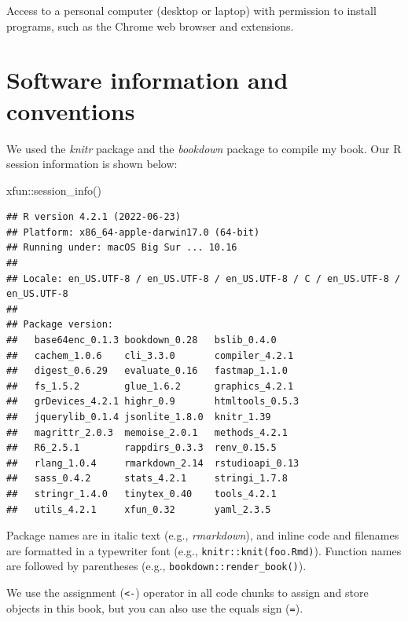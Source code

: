\documentclass[
  krantz2]{krantz}
\makeatletter
\newenvironment{Shaded}{\begin{snugshade}}{\end{snugshade}}
\newcommand{\FunctionTok}[1]{\textcolor[rgb]{0,0,0}{#1}}
\newcommand{\NormalTok}[1]{#1}
\newcommand{\SpecialCharTok}[1]{\textcolor[rgb]{0,0,0}{#1}}
\newenvironment{kframe}{%
\medskip{}
\setlength{\fboxsep}{.8em}
 \def\at@end@of@kframe{}%
 \ifinner\ifhmode%
  \def\at@end@of@kframe{\end{minipage}}%
  \begin{minipage}{\columnwidth}%
 \fi\fi%
 \def\FrameCommand##1{\hskip\@totalleftmargin \hskip-\fboxsep
 \colorbox{shadecolor}{##1}\hskip-\fboxsep
     \hskip-\linewidth \hskip-\@totalleftmargin \hskip\columnwidth}%
 \MakeFramed {\advance\hsize-\width
   \@totalleftmargin\z@ \linewidth\hsize
   \@setminipage}}%
 {\par\unskip\endMakeFramed%
 \at@end@of@kframe}
\renewenvironment{Shaded}{\begin{kframe}}{\end{kframe}}
\makeatother
\begin{document}
Access to a personal computer (desktop or laptop) with permission to install programs, such as the Chrome web browser and extensions.

\hypertarget{software-information-and-conventions}{%
\section*{Software information and conventions}\label{software-information-and-conventions}}


We used the \emph{knitr} package \citep{xie2015} and the \emph{bookdown} package \citep{R-bookdown} to compile my book. Our R session information is shown below:

\begin{Shaded}
\begin{Highlighting}[]
\NormalTok{xfun}\SpecialCharTok{::}\FunctionTok{session\_info}\NormalTok{()}
\end{Highlighting}
\end{Shaded}

\begin{verbatim}
## R version 4.2.1 (2022-06-23)
## Platform: x86_64-apple-darwin17.0 (64-bit)
## Running under: macOS Big Sur ... 10.16
##
## Locale: en_US.UTF-8 / en_US.UTF-8 / en_US.UTF-8 / C / en_US.UTF-8 / en_US.UTF-8
##
## Package version:
##   base64enc_0.1.3 bookdown_0.28   bslib_0.4.0
##   cachem_1.0.6    cli_3.3.0       compiler_4.2.1
##   digest_0.6.29   evaluate_0.16   fastmap_1.1.0
##   fs_1.5.2        glue_1.6.2      graphics_4.2.1
##   grDevices_4.2.1 highr_0.9       htmltools_0.5.3
##   jquerylib_0.1.4 jsonlite_1.8.0  knitr_1.39
##   magrittr_2.0.3  memoise_2.0.1   methods_4.2.1
##   R6_2.5.1        rappdirs_0.3.3  renv_0.15.5
##   rlang_1.0.4     rmarkdown_2.14  rstudioapi_0.13
##   sass_0.4.2      stats_4.2.1     stringi_1.7.8
##   stringr_1.4.0   tinytex_0.40    tools_4.2.1
##   utils_4.2.1     xfun_0.32       yaml_2.3.5
\end{verbatim}

Package names are in italic text (e.g., \emph{rmarkdown}), and inline code and filenames are formatted in a typewriter font (e.g., \texttt{knitr::knit(\textquotesingle{}foo.Rmd\textquotesingle{})}). Function names are followed by parentheses (e.g., \texttt{bookdown::render\_book()}).

We use the assignment (\texttt{\textless{}-}) operator in all code chunks to assign and store objects in this book, but you can also use the equals sign (\texttt{=}).
\end{document}

